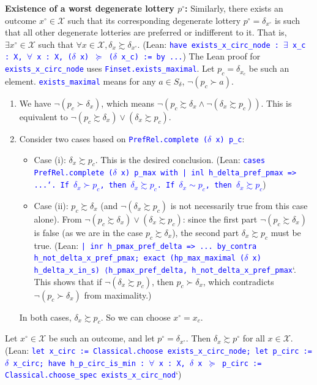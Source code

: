 \documentclass{article}
\theoremstyle{definition}
\newcommand{\X}{\mathcal{X}}
\newcommand{\tactic}[1]{\textcolor{blue}{\texttt{#1}}}
\newcommand{\pref}{\succsim} %
\newcommand{\strictpref}{\succ} %
\newcommand{\indiff}{\sim} %
\begin{document}
\textbf{Existence of a worst degenerate lottery $p^\circ$:}
Similarly, there exists an outcome $x^\circ \in \X$ such that its corresponding degenerate lottery $p^\circ = \delta_{x^\circ}$ is such that all other degenerate lotteries are preferred or indifferent to it. That is, $\exists x^\circ \in \X$ such that $\forall x \in \X, \delta_x \pref \delta_{x^\circ}$.
(Lean: \tactic{have exists\_x\_circ\_node : $\exists$ x\_c : X, $\forall$ x : X, ($\delta$ x) $\succeq$ ($\delta$ x\_c) := by ...})
The Lean proof for \tactic{exists\_x\_circ\_node} uses \tactic{Finset.exists\_maximal}. Let $p_c = \delta_{x_c}$ be such an element. \tactic{exists\_maximal} means for any $a \in S_\delta$, $\lnot (p_c \strictpref a)$.
\begin{enumerate}
    \item We have $\lnot (p_c \strictpref \delta_x)$, which means $\lnot (p_c \pref \delta_x \land \lnot(\delta_x \pref p_c))$. This is equivalent to $\neg(p_c \pref \delta_x) \lor (\delta_x \pref p_c)$.
    \item Consider two cases based on \tactic{PrefRel.complete ($\delta$ x) p\_c}:
    \begin{itemize}
        \item Case (i): $\delta_x \pref p_c$. This is the desired conclusion.
        (Lean: \tactic{cases PrefRel.complete ($\delta$ x) p\_max with | inl h\_delta\_pref\_pmax => ...`. If $\delta_x \strictpref p_c$, then $\delta_x \pref p_c$. If $\delta_x \indiff p_c$, then $\delta_x \pref p_c$})
        \item Case (ii): $p_c \pref \delta_x$ (and $\neg(\delta_x \pref p_c)$ is not necessarily true from this case alone). From $\neg(p_c \pref \delta_x) \lor (\delta_x \pref p_c)$: since the first part $\neg(p_c \pref \delta_x)$ is false (as we are in the case $p_c \pref \delta_x$), the second part $\delta_x \pref p_c$ must be true.
        (Lean: \tactic{| inr h\_pmax\_pref\_delta => ... by\_contra h\_not\_delta\_x\_pref\_pmax; exact (hp\_max\_maximal ($\delta$ x) h\_delta\_x\_in\_s) ⟨h\_pmax\_pref\_delta, h\_not\_delta\_x\_pref\_pmax}`. This shows that if $\neg(\delta_x \pref p_c)$, then $p_c \strictpref \delta_x$, which contradicts $\lnot(p_c \strictpref \delta_x)$ from maximality.)
    \end{itemize}
    In both cases, $\delta_x \pref p_c$. So we can choose $x^\circ = x_c$.
\end{enumerate}
Let $x^\circ \in \X$ be such an outcome, and let $p^\circ = \delta_{x^\circ}$. Then $\delta_x \pref p^\circ$ for all $x \in \X$.
(Lean: \tactic{let x\_circ := Classical.choose exists\_x\_circ\_node; let p\_circ := $\delta$ x\_circ; have h\_p\_circ\_is\_min : $\forall$ x : X, $\delta$ x $\succeq$ p\_circ := Classical.choose\_spec exists\_x\_circ\_nod}`)
\end{document}
